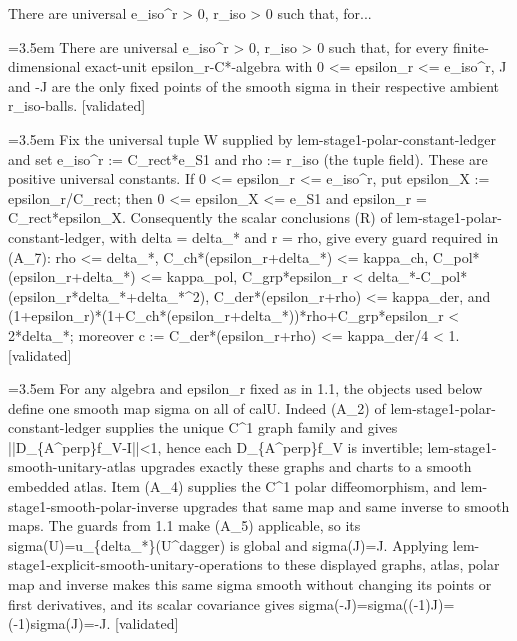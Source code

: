\documentclass{article}
\newcommand{\step}[1]{\par\noindent\hangindent=3.5em\hangafter=1%
  \makebox[3.5em][l]{\textbf{#1.}}}
\newcommand{\steptag}[1]{\hfill{\small\textsf{[#1]}}}
\begin{document}
\begin{proofbox}{There are universal e\_iso\textasciicircum{}r > 0, r\_iso > 0 such that, for...}
\step{1} There are universal e\_iso\textasciicircum{}r > 0, r\_iso > 0 such that, for every finite-dimensional exact-unit epsilon\_r-C*-algebra with 0 <= epsilon\_r <= e\_iso\textasciicircum{}r, J and -J are the only fixed points of the smooth sigma in their respective ambient r\_iso-balls. \steptag{validated} \\[6pt]
\step{1.1} Fix the universal tuple W supplied by lem-stage1-polar-constant-ledger and set e\_iso\textasciicircum{}r := C\_rect*e\_S1 and rho := r\_iso (the tuple field). These are positive universal constants. If 0 <= epsilon\_r <= e\_iso\textasciicircum{}r, put epsilon\_X := epsilon\_r/C\_rect; then 0 <= epsilon\_X <= e\_S1 and epsilon\_r = C\_rect*epsilon\_X. Consequently the scalar conclusions (R) of lem-stage1-polar-constant-ledger, with delta = delta\_* and r = rho, give every guard required in (A\_7): rho <= delta\_*, C\_ch*(epsilon\_r+delta\_*) <= kappa\_ch, C\_pol*(epsilon\_r+delta\_*) <= kappa\_pol, C\_grp*epsilon\_r < delta\_*-C\_pol*(epsilon\_r*delta\_*+delta\_*\textasciicircum{}2), C\_der*(epsilon\_r+rho) <= kappa\_der, and (1+epsilon\_r)*(1+C\_ch*(epsilon\_r+delta\_*))*rho+C\_grp*epsilon\_r < 2*delta\_*; moreover c := C\_der*(epsilon\_r+rho) <= kappa\_der/4 < 1. \steptag{validated} \\[4pt]
\step{1.2} For any algebra and epsilon\_r fixed as in 1.1, the objects used below define one smooth map sigma on all of calU. Indeed (A\_2) of lem-stage1-polar-constant-ledger supplies the unique C\textasciicircum{}1 graph family and gives ||D\_\{A\textasciicircum{}perp\}f\_V-I||<1, hence each D\_\{A\textasciicircum{}perp\}f\_V is invertible; lem-stage1-smooth-unitary-atlas upgrades exactly these graphs and charts to a smooth embedded atlas. Item (A\_4) supplies the C\textasciicircum{}1 polar diffeomorphism, and lem-stage1-smooth-polar-inverse upgrades that same map and same inverse to smooth maps. The guards from 1.1 make (A\_5) applicable, so its sigma(U)=u\_\{delta\_*\}(U\textasciicircum{}dagger) is global and sigma(J)=J. Applying lem-stage1-explicit-smooth-unitary-operations to these displayed graphs, atlas, polar map and inverse makes this same sigma smooth without changing its points or first derivatives, and its scalar covariance gives sigma(-J)=sigma((-1)J)=(-1)sigma(J)=-J. \steptag{validated} \\[4pt]

\end{proofbox}
\end{document}
